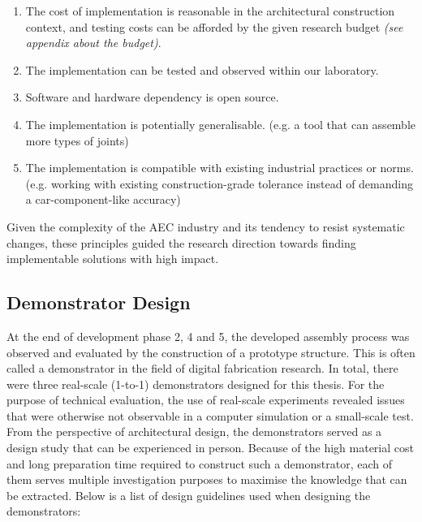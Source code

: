 \documentclass[11pt]{book}
\begin{document}
\begin{enumerate}
	\item The cost of implementation is reasonable in the architectural construction context, and testing costs can be afforded by the given research budget \textit{(see appendix about the budget)}.

	\item The implementation can be tested and observed within our laboratory.

	\item Software and hardware dependency is open source.

	\item The implementation is potentially generalisable. (e.g. a tool that can assemble more types of joints)

	\item The implementation is compatible with existing industrial practices or norms. (e.g. working with existing construction-grade tolerance instead of demanding a car-component-like accuracy) 

\end{enumerate}
Given the complexity of the AEC industry and its tendency to resist systematic changes, these principles guided the research direction towards finding implementable solutions with high impact.

\subsection{Demonstrator Design}

At the end of development phase 2, 4 and 5, the developed assembly process was observed and evaluated by the construction of a prototype structure. This is often called a demonstrator in the field of digital fabrication research. In total, there were three real-scale (1-to-1) demonstrators designed for this thesis. For the purpose of technical evaluation, the use of real-scale experiments revealed issues that were otherwise not observable in a computer simulation or a small-scale test. From the perspective of architectural design, the demonstrators served as a design study that can be experienced in person. Because of the high material cost and long preparation time required to construct such a demonstrator, each of them serves multiple investigation purposes to maximise the knowledge that can be extracted. Below is a list of design guidelines used when designing the demonstrators:
\end{document}
